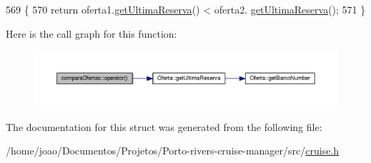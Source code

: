 \begin{DoxyCode}
569                                                            \{
570         \textcolor{keywordflow}{return} oferta1.\hyperlink{classOferta_a1caf2c681c14c9fbd04312b35f99b64c}{getUltimaReserva}() < oferta2.
      \hyperlink{classOferta_a1caf2c681c14c9fbd04312b35f99b64c}{getUltimaReserva}();
571     \}
\end{DoxyCode}


Here is the call graph for this function\+:
\nopagebreak
\begin{figure}[H]
\begin{center}
\leavevmode
\includegraphics[width=350pt]{structcomparaOfertas_a8b792bc79e9870004caa3e95826a0f1f_cgraph}
\end{center}
\end{figure}




The documentation for this struct was generated from the following file\+:\begin{DoxyCompactItemize}
\item 
/home/joao/\+Documentos/\+Projetos/\+Porto-\/rivers-\/cruise-\/manager/src/\hyperlink{cruise_8h}{cruise.\+h}\end{DoxyCompactItemize}
